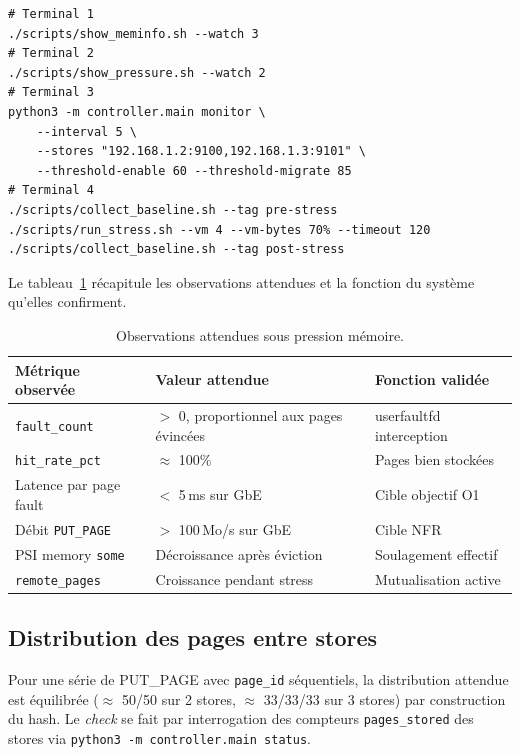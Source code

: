 \begin{lstlisting}[basicstyle=\ttfamily\footnotesize, frame=single]
# Terminal 1
./scripts/show_meminfo.sh --watch 3
# Terminal 2
./scripts/show_pressure.sh --watch 2
# Terminal 3
python3 -m controller.main monitor \
    --interval 5 \
    --stores "192.168.1.2:9100,192.168.1.3:9101" \
    --threshold-enable 60 --threshold-migrate 85
# Terminal 4
./scripts/collect_baseline.sh --tag pre-stress
./scripts/run_stress.sh --vm 4 --vm-bytes 70% --timeout 120
./scripts/collect_baseline.sh --tag post-stress
\end{lstlisting}

Le tableau~\ref{tab:pression} récapitule les observations attendues et la fonction du système qu'elles confirment.

\begin{table}[H]
\centering
\small
\caption{Observations attendues sous pression mémoire.}
\begin{tabular}{p{3.5cm}p{5cm}p{4.5cm}}
\toprule
\textbf{Métrique observée} & \textbf{Valeur attendue} & \textbf{Fonction validée} \\
\midrule
\texttt{fault\_count}      & $>$ 0, proportionnel aux pages évincées & userfaultfd interception \\
\texttt{hit\_rate\_pct}    & $\approx$ 100\%                          & Pages bien stockées \\
Latence par page fault     & $<$ 5\,ms sur GbE                        & Cible objectif O1 \\
Débit \texttt{PUT\_PAGE}   & $>$ 100\,Mo/s sur GbE                    & Cible NFR \\
PSI memory \texttt{some}   & Décroissance après éviction              & Soulagement effectif \\
\texttt{remote\_pages}     & Croissance pendant stress                & Mutualisation active \\
\bottomrule
\end{tabular}

\label{tab:pression}
\end{table}

\subsection{Distribution des pages entre stores}

Pour une série de PUT\_PAGE avec \texttt{page\_id} séquentiels, la distribution attendue est équilibrée (\(\approx\) 50/50 sur 2 stores, \(\approx\) 33/33/33 sur 3 stores) par construction du hash. Le \emph{check} se fait par interrogation des compteurs \texttt{pages\_stored} des stores via \texttt{python3 -m controller.main status}.


